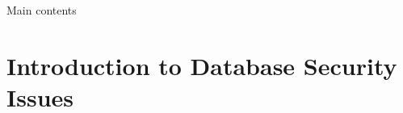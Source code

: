 \documentclass[10pt, aspectratio=169]{beamer}
\begin{document}



\begin{frame}{Main contents}
    \tableofcontents
\end{frame}

\section{Introduction to Database Security Issues}





%
\end{document}
